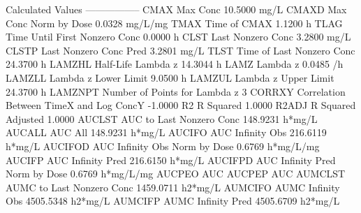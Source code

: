 \documentclass[12pt,]{krantz}
\newenvironment{Shaded}{\begin{snugshade}}{\end{snugshade}}
\newcommand{\ExtensionTok}[1]{#1}
\newcommand{\NormalTok}[1]{#1}
\begin{document}
\begin{Shaded}
\begin{Highlighting}[]
\ExtensionTok{Calculated}\NormalTok{ Values}
\ExtensionTok{-----------------}
\ExtensionTok{CMAX}\NormalTok{       Max Conc                                       10.5000 mg/L}
\ExtensionTok{CMAXD}\NormalTok{      Max Conc Norm by Dose                           0.0328 mg/L/mg}
\ExtensionTok{TMAX}\NormalTok{       Time of CMAX                                    1.1200 h}
\ExtensionTok{TLAG}\NormalTok{       Time Until First Nonzero Conc                   0.0000 h}
\ExtensionTok{CLST}\NormalTok{       Last Nonzero Conc                               3.2800 mg/L}
\ExtensionTok{CLSTP}\NormalTok{      Last Nonzero Conc Pred                          3.2801 mg/L}
\ExtensionTok{TLST}\NormalTok{       Time of Last Nonzero Conc                      24.3700 h}
\ExtensionTok{LAMZHL}\NormalTok{     Half-Life Lambda z                             14.3044 h}
\ExtensionTok{LAMZ}\NormalTok{       Lambda z                                        0.0485 /h}
\ExtensionTok{LAMZLL}\NormalTok{     Lambda z Lower Limit                            9.0500 h}
\ExtensionTok{LAMZUL}\NormalTok{     Lambda z Upper Limit                           24.3700 h}
\ExtensionTok{LAMZNPT}\NormalTok{    Number of Points for Lambda z                   3}
\ExtensionTok{CORRXY}\NormalTok{     Correlation Between TimeX and Log ConcY        -1.0000 }
\ExtensionTok{R2}\NormalTok{         R Squared                                       1.0000 }
\ExtensionTok{R2ADJ}\NormalTok{      R Squared Adjusted                              1.0000 }
\ExtensionTok{AUCLST}\NormalTok{     AUC to Last Nonzero Conc                      148.9231 h*mg/L}
\ExtensionTok{AUCALL}\NormalTok{     AUC All                                       148.9231 h*mg/L}
\ExtensionTok{AUCIFO}\NormalTok{     AUC Infinity Obs                              216.6119 h*mg/L}
\ExtensionTok{AUCIFOD}\NormalTok{    AUC Infinity Obs Norm by Dose                   0.6769 h*mg/L/mg}
\ExtensionTok{AUCIFP}\NormalTok{     AUC Infinity Pred                             216.6150 h*mg/L}
\ExtensionTok{AUCIFPD}\NormalTok{    AUC Infinity Pred Norm by Dose                  0.6769 h*mg/L/mg}
\ExtensionTok{AUCPEO}\NormalTok{     AUC %
\ExtensionTok{AUCPEP}\NormalTok{     AUC %
\ExtensionTok{AUMCLST}\NormalTok{    AUMC to Last Nonzero Conc                    1459.0711 h2*mg/L}
\ExtensionTok{AUMCIFO}\NormalTok{    AUMC Infinity Obs                            4505.5348 h2*mg/L}
\ExtensionTok{AUMCIFP}\NormalTok{    AUMC Infinity Pred                           4505.6709 h2*mg/L}
}}
\end{Highlighting}
\end{Shaded}
\end{document}
